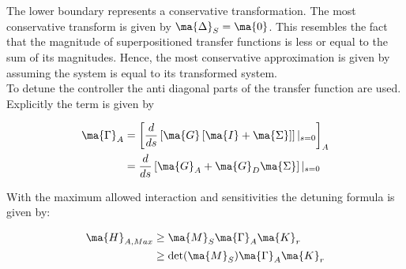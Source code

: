 The lower boundary represents a conservative transformation. The most conservative transform is given by $\ma{\Delta}_S = \ma{0}$. This resembles the fact that the magnitude of superpositioned transfer functions is less or equal to the sum of its magnitudes. Hence, the most conservative approximation is given by assuming the system is equal to its transformed system. \\

To detune the controller the anti diagonal parts of the transfer function are used. Explicitly the term is given by

\begin{align}
\begin{split}
\ma{\Gamma}_A &= \left[\frac{d}{ds}\left[ \ma{G} \left[ \ma{I} + \ma{\Sigma} \right] \right]|_{s=0}\right]_A\\
&= \frac{d}{ds}\left[ \ma{G}_A + \ma{G}_D \ma{\Sigma} \right]|_{s=0}
\end{split}
\end{align}

With the maximum allowed interaction and sensitivities the detuning formula is given by:

\begin{align}
\begin{split}
\ma{H}_{A,Max} &\geq \ma{M}_S \ma{\Gamma}_A \ma{K}_r \\ 
&\geq \det(\ma{M}_S) \ma{\Gamma}_A \ma{K}_r 
\end{split}
\end{align}

